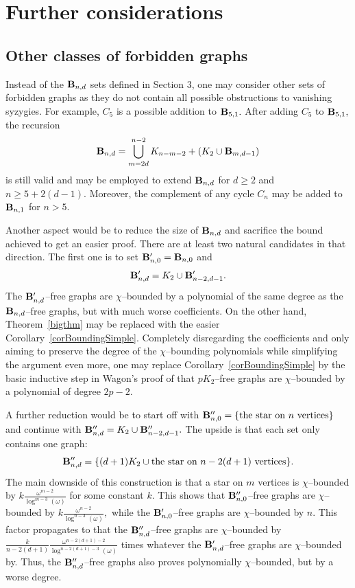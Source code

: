 \documentclass{article}
\theoremstyle{plain}
\theoremstyle{definition}
\begin{document}
\section{Further considerations}
\subsection{Other classes of forbidden graphs}
Instead of the ${\bf B}_{n,d}$ sets defined in Section 3, one may consider other sets of forbidden graphs as they do not contain all possible obstructions to vanishing syzygies. For example, $C_5$ is a possible addition to ${\bf B}_{5,1}.$ After adding $C_5$ to ${\bf B}_{5,1},$ the recursion
\[{\bf B}_{n,d} = \bigcup_{m=2d}^{n-2} K_{n-m-2}+(K_2\cup {\bf B}_{m,d-1}) \] 
is still valid and may be employed to extend ${\bf B}_{n,d}$ for $d\geq 2$ and $n\geq 5+2(d-1).$
Moreover, the complement of any cycle $C_n$ may be added to  ${\bf B}_{n,1}$ for $n>5.$

Another aspect would be to reduce the size of ${\bf B}_{n,d}$ and sacrifice the bound achieved to get an easier proof. There are at least two natural candidates in that direction. The first one is to set ${\bf B}_{n,0}' = {\bf B}_{n,0}$ and
\[{\bf B}_{n,d}' = K_2\cup {\bf B}_{n-2,d-1}'. \]
The ${\bf B}_{n,d}'$--free graphs are $\chi$--bounded by a polynomial of the same degree as the ${\bf B}_{n,d}$--free graphs, but with much worse coefficients. On the other hand, Theorem~\ref{bigthm} may be replaced with the easier Corollary~\ref{corBoundingSimple}. Completely disregarding the coefficients and only aiming to preserve the degree of the $\chi$--bounding polynomials while simplifying the argument even more, one may replace Corollary~\ref{corBoundingSimple} by the basic inductive step in Wagon's proof of that $pK_2$--free graphs are $\chi$--bounded by a polynomial of degree $2p-2.$

A further reduction would be to start off with ${\bf B}_{n,0}'' = \{ \textrm{the star on $n$ vertices} \}$ and continue with ${\bf B}_{n,d}'' = K_2\cup {\bf B}_{n-2,d-1}''.$ The upside is that each set only contains one graph:
\[ {\bf B}_{n,d}'' =  \{ (d+1)K_2 \cup \textrm{the star on $n-2(d+1)$ vertices} \}. \]
The main downside of this construction is that a star on $m$ vertices is $\chi$--bounded by $k\frac{\omega^{m-2}}{\log^{m-3} (\omega)}$ for some constant $k.$ %
This shows that ${\bf B}_{n,0}''$--free graphs are $\chi$--bounded by $k\frac{\omega^{n-2}}{\log^{n-3} (\omega)},$ while the ${\bf B}_{n,0}'$--free graphs are $\chi$--bounded by $n.$ This factor propagates to that
the ${\bf B}_{n,d}''$--free graphs are $\chi$--bounded by $\frac{k}{n-2(d+1)}\frac{\omega^{n-2(d+1)-2}}{\log^{n-2(d+1)-3} (\omega)}$ times whatever the ${\bf B}_{n,d}'$--free graphs are $\chi$--bounded by. Thus, the ${\bf B}_{n,d}''$--free graphs also proves polynomially $\chi$--bounded, but by a worse degree.
\end{document}
